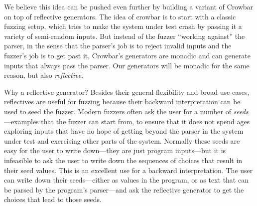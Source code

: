 We believe this idea can be pushed even further by building
a variant of Crowbar on top of reflective generators.
The idea of crowbar is to start with a classic fuzzing setup, which tries to make the
system under test
crash by passing it a variety of semi-random inputs. But instead of
the fuzzer
``working against'' the parser, in the sense that the parser's job is to reject
invalid inputs and the fuzzer's job is to get past it, Crowbar's generators are
monadic and can generate
inputs that always pass the parser. Our generators will be monadic for the same
reason, but also {\em reflective}.

Why a reflective generator? Besides their general flexibility and broad
use-cases, reflectives are useful for fuzzing because their backward
interpretation can be used to seed the fuzzer.
Modern fuzzers often
ask the user for a number of {\em seeds}---examples that the fuzzer
can start from,
to ensure that it does not spend ages exploring
inputs that have no hope of getting beyond the parser in the system
under test and exercising other parts of the system. Normally these
seeds are easy
for the user to write down---they are just program inputs---but
it is infeasible to ask the user to write down the sequences of choices that
result in their seed values.
This is an excellent use for a
backward interpretation. The user can write down their seeds---either as values
in the program, or as text that can be parsed by the program's parser---and
ask the reflective generator to get the choices that lead to those seeds.



